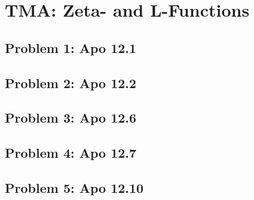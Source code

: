 \section{TMA: Zeta- and L-Functions}

\subsection[Problem 1]{Problem 1: Apo 12.1}

\subsection[Problem 2]{Problem 2: Apo 12.2}

\subsection[Problem 3]{Problem 3: Apo 12.6}

\subsection[Problem 4]{Problem 4: Apo 12.7}

\subsection[Problem 5]{Problem 5: Apo 12.10}